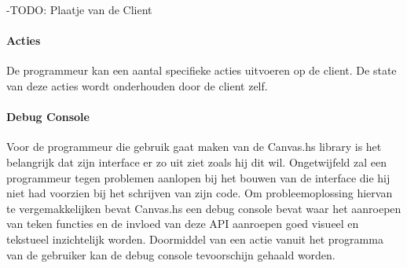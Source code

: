 -TODO: Plaatje van de Client


\paragraph{Acties}
De programmeur kan een aantal specifieke acties uitvoeren op de client. De state van deze acties wordt onderhouden door de client zelf. 



\paragraph{Debug Console}
Voor de programmeur die gebruik gaat maken van de Canvas.hs library is het belangrijk dat zijn interface er zo uit ziet zoals hij dit wil. Ongetwijfeld zal een programmeur tegen problemen aanlopen bij het bouwen van de interface die hij niet had voorzien bij het schrijven van zijn code. Om probleemoplossing hiervan te vergemakkelijken bevat Canvas.hs een debug console bevat waar het aanroepen van teken functies en de invloed van deze API aanroepen goed visueel en tekstueel inzichtelijk worden. Doormiddel van een actie vanuit het programma van de gebruiker kan de debug console tevoorschijn gehaald worden.
